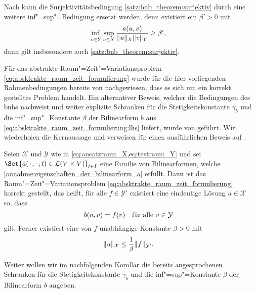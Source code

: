 \documentclass[../main.tex]{subfiles}
\begin{document}
\begin{Bemerkung}
\label{bemerkung:bnb_theorem_inf_sup_statt_surjektiv}
    Nach \cite[Remarks, S. 117]{Aziz:1972wf} kann die Surjektivitätsbedingung \cref{satz:bnb_theorem:surjektiv} durch eine weitere inf"=sup"=Bedingung ersetzt werden, denn existiert ein $\beta' > 0$ mit
    \begin{equation}
        \infsup{v \in Y}{u \in X} \frac{a(u, v)}{\norm{u}_{X} \norm{v}_{Y}} \geq \beta',
    \end{equation}
    dann gilt insbesondere auch \cref{satz:bnb_theorem:surjektiv}.
\end{Bemerkung}

Für das abstrakte Raum"=Zeit"=Variationsproblem \cref{eq:absktrakte_raum_zeit_formulierung} wurde für die hier vorliegenden Rahmenbedingungen bereits von \textcite[Section XVIII.3]{Dautray:1992by} nachgewiesen, dass es sich um ein korrekt gestelltes Problem handelt.
Ein alternativer Beweis, welcher die Bedingungen des \acl{bnb}s nachweist und weiter explizite Schranken für die Stetigkeitskonstante $\gamma_{b}$ und die inf"=sup"=Konstante $\beta$ der Bilinearform $b$ aus \cref{eq:absktrakte_raum_zeit_formulierung:lhs} liefert, wurde von \textcite{Schwab:2009ec} geführt.
Wir wiederholen die Kernaussage \cite[Theorem 5.1]{Schwab:2009ec} und verweisen für einen ausführlichen Beweis auf \cite[Appendix A]{Schwab:2009ec}.

\begin{Satz}
\label{satz:ss09:theorem51}
    Seien $\mathcal X$ und $\mathcal Y$ wie in \cref{eq:ansatzraum_X,eq:testraum_Y} und sei $\Set{a(\blank, \blank; t) \in \mathcal L (V \times V)}_{t \in I}$ eine Familie von Bilinearformen, welche \cref{annahme:eigenschaften_der_bilinearform_a} erfüllt.
    Dann ist das Raum"=Zeit"=Variationsproblem \cref{eq:absktrakte_raum_zeit_formulierung} korrekt gestellt, das heißt, für alle $f \in \mathcal Y'$ existiert eine eindeutige Lösung $u \in \mathcal X$ so, dass
    \begin{equation}
        b(u, v) = f(v) \quad \fa v \in \mathcal Y
    \end{equation}
    gilt.
    Ferner existiert eine von $f$ unabhängige Konstante $\beta > 0$ mit
    \begin{equation}
        \norm{u}_{\mathcal X} \leq \frac{1}{\beta} \norm{f}_{\mathcal Y'}.
    \end{equation}
\end{Satz}

Weiter wollen wir im nachfolgenden Korollar die bereits angesprochenen Schranken für die Stetigkeitskonstante $\gamma_{b}$ und die inf"=sup"=Konstante $\beta$ der Bilinearform $b$ angeben.
\end{document}
